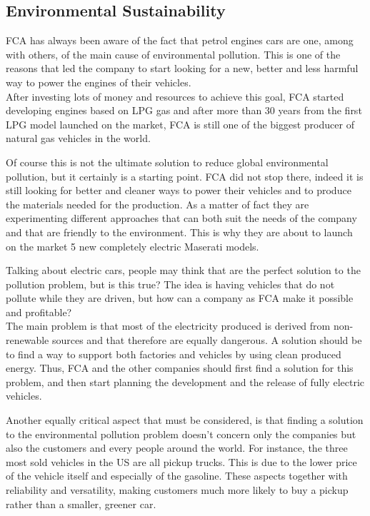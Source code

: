 \subsection{Environmental Sustainability}
FCA has always been aware of the fact that petrol engines cars are one, among with others, of the main cause of environmental pollution. This is one of the reasons that led the company to start looking for a new, better and less harmful way to power the engines of their vehicles.\\
After investing lots of money and resources to achieve this goal, FCA started developing engines based on LPG gas and after more than 30 years from the first LPG model launched on the market, FCA is still one of the biggest producer of natural gas vehicles in the world\cite{FCA_sustainability}.

Of course this is not the ultimate solution to reduce global environmental pollution, but it certainly is a starting point. FCA did not stop there, indeed it is still looking for better and cleaner ways to power their vehicles and to produce the materials needed for the production. As a matter of fact they are experimenting different approaches that can both suit the needs of the company and that are friendly to the environment. This is why they are about to launch on the market 5 new completely electric Maserati models\cite{Maserati_electric}.

Talking about electric cars, people may think that are the perfect solution to the pollution problem, but is this true?
The idea is having vehicles that do not pollute while they are driven, but how can a company as FCA make it possible and profitable?\\
The main problem is that most of the electricity produced is derived from non-renewable sources and that therefore are equally dangerous. A solution should be to find a way to support both factories and vehicles by using clean produced energy. Thus, FCA and the other companies should first find a solution for this problem, and then start planning the development and the release of fully electric vehicles.

Another equally critical aspect that must be considered, is that finding a solution to the environmental pollution problem doesn't concern only the companies but also the customers and every people around the world. For instance, the three most sold vehicles in the US are all pickup trucks\cite{US_best-selling-vehicle}. This is due to the lower price of the vehicle itself and especially of the gasoline. These aspects together with reliability and versatility, making customers much more likely to buy a pickup rather than a smaller, greener car.

